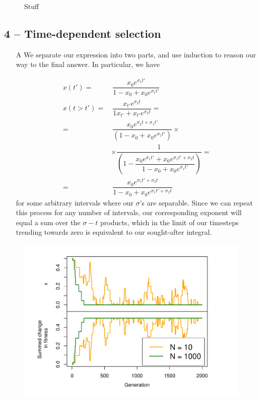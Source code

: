 \documentclass[10pt]{article}\usepackage[]{graphicx}\usepackage[]{color}
\makeatletter
\def\maxwidth{ %
  \ifdim\Gin@nat@width>\linewidth
    \linewidth
  \else
    \Gin@nat@width
  \fi
}
\theoremstyle{plain}
\makeatother
\begin{document}
\begin{multicols*}{2}
\begin{Schunk}
\begin{figure}[H]
{}

\caption[Stuff]{Stuff}\label{fig:stochd}
\end{figure}
\end{Schunk}

\subsection*{4 -- Time-dependent selection}
\begin{enumerate}
  \item[A] We separate our expression into two parts, and use induction to reason our way to the final answer. In particular, we have 
  
  \begin{align*}
  x(t')   =&~\dfrac{x_0e^{\sigma_1t'}}{1 - x_0 + x_0 e^{\sigma_1t'}} \\
  x(t>t') =&~\dfrac{x_{t'}e^{\sigma_2t}}{1  x_{t'} + x_{t'}e^{\sigma_2t}} = \\
          =&~\dfrac{x_0 e^{\sigma_2t + \sigma_1t'}}{\left(1 - x_0 + x_0e^{\sigma_1t'}\right)} \times \\
         &\times \dfrac{1}{\left(1 - \dfrac{x_0e^{\sigma_1t'} + x_0e^{\sigma_1t' + \sigma_2t}}{
            1 - x_0 + x_0e^{\sigma_1t'}}\right)} = \\
          =&~\dfrac{x_0e^{\sigma_1t' + \sigma_2t}}{1 - x_0 + x_0e^{\sigma_1t' + \sigma_2t}}
  \end{align*}
  for some arbitrary intervals where our $\sigma$'s are separable. Since we can repeat this process for any number of intervals, our corresponding exponent will equal a sum over the $\sigma-t$ products, which in the limit of our timesteps trending towards zero is equivalent to our sought-after integral.
  
\end{enumerate}

\begin{Schunk}
\begin{figure}[H]

{\centering \includegraphics[width=\maxwidth]{figure/twocolumn-fisherb-1} 

}
\end{figure}
\end{Schunk}
\end{multicols*}
\end{document}
